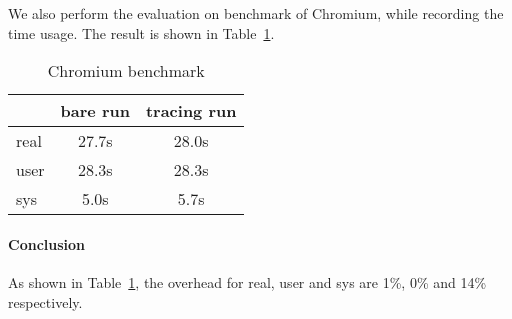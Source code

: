 We also perform the evaluation on benchmark of Chromium, while recording the
time usage. The result is shown in Table~\ref{tab:chromium benchmark}.

\begin{table}[ht]
\begin{tabular}{l|c|c}
\hline
 & bare run & tracing run \\
\hline
real & 27.7s & 28.0s \\
\hline
user & 28.3s & 28.3s \\
\hline
sys &  5.0s & 5.7s\\
\hline
\end{tabular}
\caption{Chromium benchmark}
\label{tab:chromium benchmark}
\end{table}

\paragraph{Conclusion}
As shown in Table~\ref{tab:chromium benchmark}, the overhead for real, user and
sys are 1\%, 0\% and 14\% respectively.
